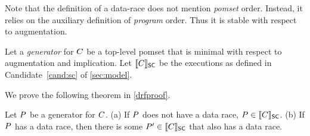 Note that the definition of a data-race does not mention \emph{pomset} order.
Instead, it relies on the auxiliary definition of \emph{program} order.  Thus
it is stable with respect to augmentation.

Let a \emph{generator} for $C$ be a top-level pomset that is minimal with
respect to augmentation and implication.  Let $\llbracket C\rrbracket_{\mathsf{SC}}$ be the
executions as defined in Candidate~\ref{cand:sc} of
\textsection\ref{sec:model}.

We prove the following theorem in \textsection\ref{drfproof}.
\begin{theorem}
  Let $P$ be a generator for $C$.
  (a) If $P$ does not have a data race, $P \in \llbracket C\rrbracket_{\mathsf{SC}}$.
  (b) If $P$ has a data race, then there is some
    $P'\in \llbracket C\rrbracket_{\mathsf{SC}}$ that also has a data race.
\end{theorem}
